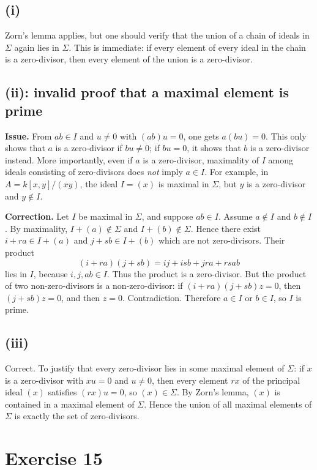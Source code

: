 \documentclass[11pt]{article}
\begin{document}
\subsection*{(i)}
Zorn's lemma applies, but one should verify that the union of a chain of
ideals in \(\Sigma\) again lies in \(\Sigma\).  This is immediate: if every
element of every ideal in the chain is a zero-divisor, then every element of
the union is a zero-divisor.

\subsection*{(ii): invalid proof that a maximal element is prime}

\textbf{Issue.}  From \(ab\in I\) and \(u\neq0\) with \((ab)u=0\), one gets
\(a(bu)=0\).  This only shows that \(a\) is a zero-divisor if \(bu\neq0\);
if \(bu=0\), it shows that \(b\) is a zero-divisor instead.  More
importantly, even if \(a\) is a zero-divisor, maximality of \(I\) among ideals
consisting of zero-divisors does \emph{not} imply \(a\in I\).  For example,
in \(A=k[x,y]/(xy)\), the ideal \(I=(x)\) is maximal in \(\Sigma\), but \(y\)
is a zero-divisor and \(y\notin I\).

\textbf{Correction.}  Let \(I\) be maximal in \(\Sigma\), and suppose
\(ab\in I\).  Assume \(a\notin I\) and \(b\notin I\).  By maximality,
\(I+(a)\notin\Sigma\) and \(I+(b)\notin\Sigma\).  Hence there exist
\(i+ra\in I+(a)\) and \(j+sb\in I+(b)\) which are not zero-divisors.  Their
product
\[
(i+ra)(j+sb)=ij+isb+jra+rsab
\]
lies in \(I\), because \(i,j,ab\in I\).  Thus the product is a zero-divisor.
But the product of two non-zero-divisors is a non-zero-divisor: if
\((i+ra)(j+sb)z=0\), then \((j+sb)z=0\), and then \(z=0\).  Contradiction.
Therefore \(a\in I\) or \(b\in I\), so \(I\) is prime.

\subsection*{(iii)}
Correct.  To justify that every zero-divisor lies in some maximal element of
\(\Sigma\): if \(x\) is a zero-divisor with \(xu=0\) and \(u\neq0\), then every
element \(rx\) of the principal ideal \((x)\) satisfies \((rx)u=0\), so
\((x)\in\Sigma\).  By Zorn's lemma, \((x)\) is contained in a maximal element
of \(\Sigma\).  Hence the union of all maximal elements of \(\Sigma\) is
exactly the set of zero-divisors.

\section*{Exercise 15}
\end{document}
